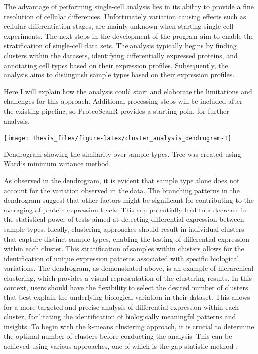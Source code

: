 \documentclass[
  11pt,
]{article}
\let\origfigure\figure
\begin{document}
The advantage of performing single-cell analysis lies in its ability to
provide a fine resolution of cellular differences. Unfortunately
variation causing effects such as cellular differentiation stages, are
mainly unknown when starting single-cell experiments. The next steps in
the development of the program aim to enable the stratification of
single-cell data sets. The analysis typically begins by finding clusters
within the datasets, identifying differentially expressed proteins, and
annotating cell types based on their expression profiles. Subsequently,
the analysis aims to distinguish sample types based on their expression
profiles.

Here I will explain how the analysis could start and elaborate the
limitations and challenges for this approach. Additional processing
steps will be included after the existing pipeline, so ProteoScanR
provides a starting point for further analysis.

\bgroup  \origfigure[H] 

{\centering \texttt{[image: Thesis\_files/figure-latex/cluster\_analysis\_dendrogram-1]} 

}

\caption{Dendrogram showing the similarity over sample types. Tree was created using Ward`s minimum variance method.}\label{fig:cluster_analysis_dendrogram}
 \endfigure\egroup

As observed in the dendrogram, it is evident that sample type alone does
not account for the variation observed in the data. The branching
patterns in the dendrogram suggest that other factors might be
significant for contributing to the averaging of protein expression
levels. This can potentially lead to a decrease in the statistical power
of tests aimed at detecting differential expression between sample
types. Ideally, clustering approaches should result in individual
clusters that capture distinct sample types, enabling the testing of
differential expression within each cluster. This stratification of
samples within clusters allows for the identification of unique
expression patterns associated with specific biological variations. The
dendrogram, as demonstrated above, is an example of hierarchical
clustering, which provides a visual representation of the clustering
results. In this context, users should have the flexibility to select
the desired number of clusters that best explain the underlying
biological variation in their dataset. This allows for a more targeted
and precise analysis of differential expression within each cluster,
facilitating the identification of biologically meaningful patterns and
insights. To begin with the k-means clustering approach, it is crucial
to determine the optimal number of clusters before conducting the
analysis. This can be achieved using various approaches, one of which is
the gap statistic method \citep{Tibshirani2001}.
\end{document}
